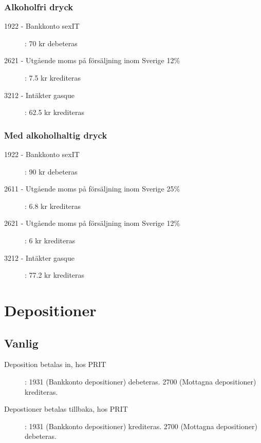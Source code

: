 \documentclass{article}
\begin{document}
\subsubsection{Alkoholfri dryck}
\begin{description}
    \item [1922 - Bankkonto sexIT ]: 70 kr debeteras
    \item [2621 - Utgående moms på försäljning inom Sverige 12\%]: 7.5 kr krediteras
    \item [3212 - Intäkter gasque]: 62.5 kr krediteras
\end{description}
\subsubsection{Med alkoholhaltig dryck}
\begin{description}
    \item [1922 - Bankkonto sexIT ]: 90 kr debeteras
    \item [2611 - Utgående moms på försäljning inom Sverige 25\%]: 6.8 kr krediteras
    \item [2621 - Utgående moms på försäljning inom Sverige 12\%]: 6 kr krediteras
    \item [3212 - Intäkter gasque]: 77.2 kr krediteras
\end{description}

\section{Depositioner}
\subsection{Vanlig}
\begin{description}
    \item [Deposition betalas in, hos PRIT]: 1931 (Bankkonto depositioner) debeteras. 2700 (Mottagna depositioner) krediteras.
    \item [Depostioner betalas tillbaka, hos PRIT]: 1931 (Bankkonto depositioner) krediteras. 2700 (Mottagna depositioner) debeteras.
\end{description}
\end{document}
